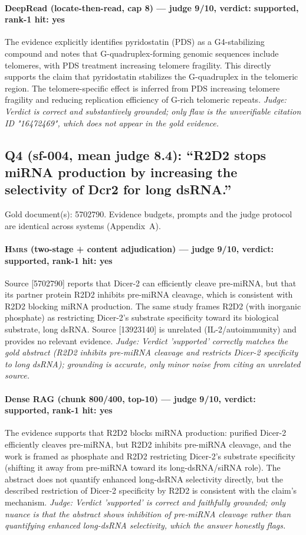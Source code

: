 \documentclass[sigconf, review, anonymous]{acmart}
\begin{document}
\paragraph{DeepRead (locate-then-read, cap 8) --- judge 9/10, verdict: supported, rank-1 hit: yes}
\noindent The evidence explicitly identifies pyridostatin (PDS) as a G4-stabilizing compound and notes that G-quadruplex-forming genomic sequences include telomeres, with PDS treatment increasing telomere fragility. This directly supports the claim that pyridostatin stabilizes the G-quadruplex in the telomeric region. The telomere-specific effect is inferred from PDS increasing telomere fragility and reducing replication efficiency of G-rich telomeric repeats.
\noindent\small\textit{Judge: Verdict is correct and substantively grounded; only flaw is the unverifiable citation ID "16472469", which does not appear in the gold evidence.}

\subsection{Q4 (sf-004, mean judge 8.4): ``R2D2 stops miRNA production by increasing the selectivity of Dcr2 for long dsRNA.''}
\label{app:q4}
\noindent Gold document(s): 5702790. Evidence budgets, prompts and the judge protocol are identical across systems (Appendix~A).
\paragraph{\textbf{\textsc{Hmrs}} (two-stage + content adjudication) --- judge 9/10, verdict: supported, rank-1 hit: yes}
\noindent Source [5702790] reports that Dicer-2 can efficiently cleave pre-miRNA, but that its partner protein R2D2 inhibits pre-miRNA cleavage, which is consistent with R2D2 blocking miRNA production. The same study frames R2D2 (with inorganic phosphate) as restricting Dicer-2's substrate specificity toward its biological substrate, long dsRNA. Source [13923140] is unrelated (IL-2/autoimmunity) and provides no relevant evidence.
\noindent\small\textit{Judge: Verdict 'supported' correctly matches the gold abstract (R2D2 inhibits pre-miRNA cleavage and restricts Dicer-2 specificity to long dsRNA); grounding is accurate, only minor noise from citing an unrelated source.}
\paragraph{Dense RAG (chunk 800/400, top-10) --- judge 9/10, verdict: supported, rank-1 hit: yes}
\noindent The evidence supports that R2D2 blocks miRNA production: purified Dicer-2 efficiently cleaves pre-miRNA, but R2D2 inhibits pre-miRNA cleavage, and the work is framed as phosphate and R2D2 restricting Dicer-2's substrate specificity (shifting it away from pre-miRNA toward its long-dsRNA/siRNA role). The abstract does not quantify enhanced long-dsRNA selectivity directly, but the described restriction of Dicer-2 specificity by R2D2 is consistent with the claim's mechanism.
\noindent\small\textit{Judge: Verdict 'supported' is correct and faithfully grounded; only nuance is that the abstract shows inhibition of pre-miRNA cleavage rather than quantifying enhanced long-dsRNA selectivity, which the answer honestly flags.}
\end{document}
